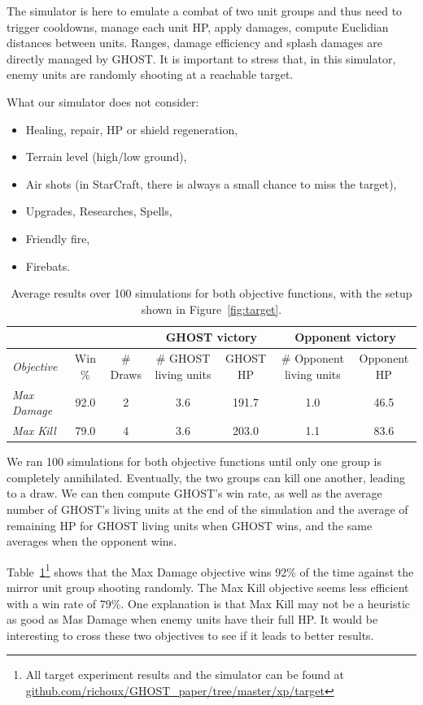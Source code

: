 \documentclass[journal]{IEEEtran}
\newcommand{\ghost}{\textsc{GHOST}\xspace}
\begin{document}
The simulator is here to emulate a  combat of two unit groups and thus
need to trigger cooldowns, manage each unit HP, apply damages, compute
Euclidian  distances  between  units. Ranges,  damage  efficiency  and
splash damages  are directly  managed by \ghost.   It is  important to
stress that, in this simulator, enemy units are randomly shooting at a
reachable target.

What our simulator does not consider:
\begin{itemize}
\item Healing, repair, HP or shield regeneration,
\item Terrain level (high/low ground),
\item Air shots (in StarCraft, there is always a small chance to miss
  the target),
\item Upgrades, Researches, Spells,
\item Friendly fire,
\item Firebats.
\end{itemize}
\begin{table}[ht]
  \caption{Average  results over  100 simulations  for both  objective
    functions, with the setup shown in Figure~\ref{fig:target}.}
  \label{tab:target}
  \centering
  \begin{tabular}{|l|c|c|c|c|c|c|} 
    \cline{4-7}
    \multicolumn{3}{c|}{} & \multicolumn{2}{c|}{\ghost victory} & \multicolumn{2}{c|}{Opponent victory}\\
    \hline
    {\em Objective} & Win \% & \# Draws & \# \ghost living units & \ghost HP &
    \# Opponent living units & Opponent HP\\
    \hline
    {\em Max Damage} & 92.0 & 2 & 3.6 & 191.7 & 1.0 & 46.5\\
    {\em Max Kill} & 79.0 & 4 & 3.6 & 203.0 & 1.1 & 83.6\\
    \hline
  \end{tabular}
\end{table}
We ran  100 simulations  for both objective  functions until  only one
group is completely  annihilated. Eventually, the two  groups can kill
one another, leading to a draw. We can then compute \ghost's win rate,
as well as the  average number of \ghost's living units  at the end of
the simulation and the average of remaining HP for \ghost living units
when \ghost wins, and the same averages when the opponent wins.

Table~\ref{tab:target}\footnote{All target experiment  results and the
  simulator            can            be           found            at
  \href{https://github.com/richoux/GHOST\_paper/tree/master/xp/target}{github.com/richoux/GHOST\_paper/tree/master/xp/target}}
shows that the Max Damage objective  wins 92\% of the time against the
mirror unit group shooting randomly. The Max Kill objective seems less
efficient with  a win rate of  79\%. One explanation is  that Max Kill
may not  be a heuristic  as good as Mas  Damage when enemy  units have
their full HP.  It would be  interesting to cross these two objectives
to see if it leads to better results.
\end{document}
